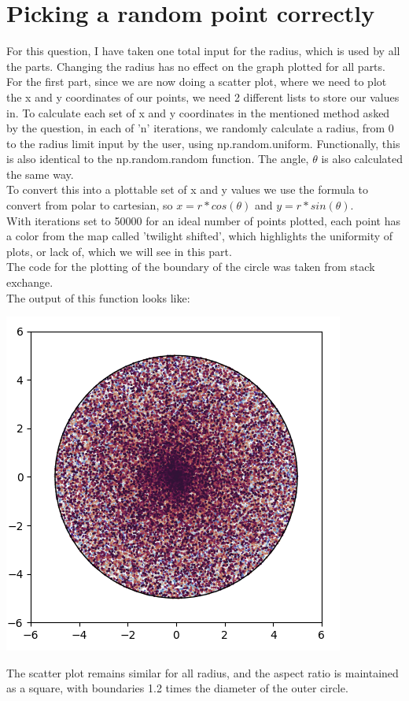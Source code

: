 \documentclass[addpoints]{exam}
\begin{document}
\newpage
\section{Picking a random point correctly}
\begin{questions}
\question
For this question, I have taken one total input for the radius, which is used by all the parts. Changing the radius has no effect on the graph plotted for all parts.\\
For the first part, since we are now doing a scatter plot, where we need to plot the x and y coordinates of our points, we need 2 different lists to store our values in. To calculate each set of x and y coordinates in the mentioned method asked by the question, in each of 'n' iterations, we randomly calculate a radius, from 0 to the radius limit input by the user, using np.random.uniform. Functionally, this is also identical to the np.random.random function. The angle, $\theta $ is also calculated the same way.\\
To convert this into a plottable set of x and y values we use the formula to convert from polar to cartesian, so $x=r*cos(\theta)$ and $y=r*sin(\theta)$.\\
With iterations set to 50000 for an ideal number of points plotted, each point has a color from the map called 'twilight shifted', which highlights the uniformity of plots, or lack of, which we will see in this part.\\
The code for the plotting of the boundary of the circle was taken from stack exchange.\\
The output of this function looks like:\\
\begin{center}
\includegraphics[width=.48\textwidth]{images/p3_1.png}
\end{center}
The scatter plot remains similar for all radius, and the aspect ratio is maintained as a square, with boundaries 1.2 times the diameter of the outer circle. \\

\end{questions}
\end{document}
